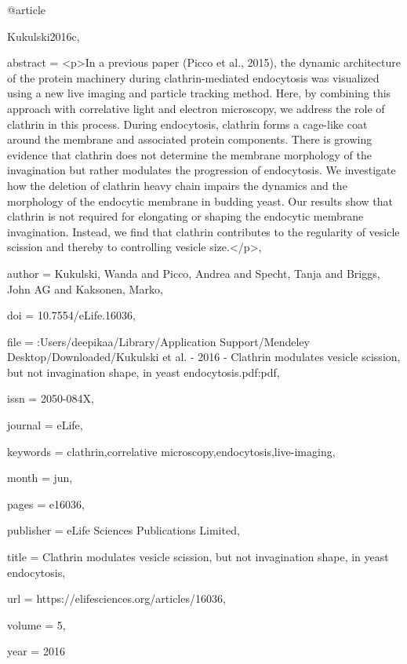 @article{Kukulski2016c,

abstract = {{\textless}p{\textgreater}In a previous paper (Picco et al., 2015), the dynamic architecture of the protein machinery during clathrin-mediated endocytosis was visualized using a new live imaging and particle tracking method. Here, by combining this approach with correlative light and electron microscopy, we address the role of clathrin in this process. During endocytosis, clathrin forms a cage-like coat around the membrane and associated protein components. There is growing evidence that clathrin does not determine the membrane morphology of the invagination but rather modulates the progression of endocytosis. We investigate how the deletion of clathrin heavy chain impairs the dynamics and the morphology of the endocytic membrane in budding yeast. Our results show that clathrin is not required for elongating or shaping the endocytic membrane invagination. Instead, we find that clathrin contributes to the regularity of vesicle scission and thereby to controlling vesicle size.{\textless}/p{\textgreater}},

author = {Kukulski, Wanda and Picco, Andrea and Specht, Tanja and Briggs, John AG and Kaksonen, Marko},

doi = {10.7554/eLife.16036},

file = {:Users/deepikaa/Library/Application Support/Mendeley Desktop/Downloaded/Kukulski et al. - 2016 - Clathrin modulates vesicle scission, but not invagination shape, in yeast endocytosis.pdf:pdf},

issn = {2050-084X},

journal = {eLife},

keywords = {clathrin,correlative microscopy,endocytosis,live-imaging},

month = {jun},

pages = {e16036},

publisher = {eLife Sciences Publications Limited},

title = {{Clathrin modulates vesicle scission, but not invagination shape, in yeast endocytosis}},

url = {https://elifesciences.org/articles/16036},

volume = {5},

year = {2016}

}

